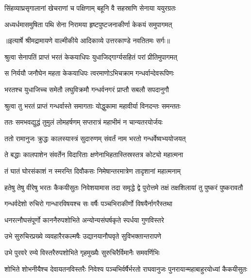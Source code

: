 \twolineshloka
{सिंहव्याघ्रसृगालानां खेचराणां च पक्षिणाम्}
{बहूनि वै सहस्राणि सेनाया ययुरग्रतः} %

\twolineshloka
{अध्यर्धमासमुषिता पथि सेना निरामया}
{हृष्टपुष्टजनाकीर्णा केकयं समुपागमत्} %


{॥इत्यार्षे श्रीमद्रामायणे वाल्मीकीये आदिकाव्ये उत्तरकाण्डे नवतितमः सर्गः॥}


\twolineshloka
{श्रुत्वा सेनापतिं प्राप्तं भरतं केकयाधिपः}
{युधाजिद्गार्ग्यसहितं परां प्रीतिमुपागमत्} %

\twolineshloka
{स निर्ययौ जनौघेन महता केकयाधिपः}
{त्वरमाणोऽभिचक्राम गन्धर्वान्देवरूपिणः} %

\twolineshloka
{भरतश्च युधाजिच्च समेतौ लघुविक्रमौ}
{गन्धर्वनगरं प्राप्तौ सबलौ सपदानुगौ} %

\twolineshloka
{श्रुत्वा तु भरतं प्राप्तं गन्धर्वास्ते समागताः}
{योद्धुकामा महावीर्या विनदन्तः समन्ततः} %

\twolineshloka
{ततः समभवद्युद्धं तुमुलं लोमहर्षणम्}
{सप्तरात्रं महाभीमं न चान्यतरयोर्जयः} %

\twolineshloka
{ततो रामानुजः क्रुद्धः कालस्यास्त्रं सुदारुणम्}
{संवर्तं नाम भरतो गन्धर्वेष्वभ्ययोजयत्} %

\twolineshloka
{ते बद्धाः कालपाशेन संवर्तेन विदारिताः}
{क्षणेनाभिहतास्तिस्रस्तत्र कोट्यो महात्मना} %

\twolineshloka
{तं घातं घोरसंकाशं न स्मरन्ति दिवौकसः}
{निमेषान्तरमात्रेण तादृशानां महात्मनाम्} %

\threelineshloka
{हतेषु तेषु वीरेषु भरतः कैकयीसुतः}
{निवेशयामास तदा समृद्धे द्वे पुरोत्तमे}
{तक्षं तक्षशिलायां तु पुष्करं पुष्करावतौ} %

\twolineshloka
{गन्धर्वदेशो रुचिरो गान्धारविषयश्च सः}
{वर्षैः पञ्चभिराकीर्णो विषयैर्नागरैस्तथा} %

\twolineshloka
{धनरत्नौघसंपूर्णो काननैरुपशोभिते}
{अन्योन्यसंघर्षकृते स्पर्धया गुणविस्तरे} %

\twolineshloka
{उभे सुरुचिरप्रख्ये व्यवहारैरकल्मषैः}
{उद्यानयानौघवृते सुविभक्तान्तरापणे} %

\twolineshloka
{उभे पुरवरे रम्ये विस्तरैरुपशोभिते}
{गृहमुख्यैः सुरुचिरैर्विमानैः समवर्णिभिः} %

\threelineshloka
{शोभिते शोभनीयैश्च देवायतनविस्तरैः}
{निवेश्य पञ्चभिर्वर्षैर्भरतो राघवानुजः}
{पुनरायान्महाबाहुरयोध्यां कैकयीसुतः} %

